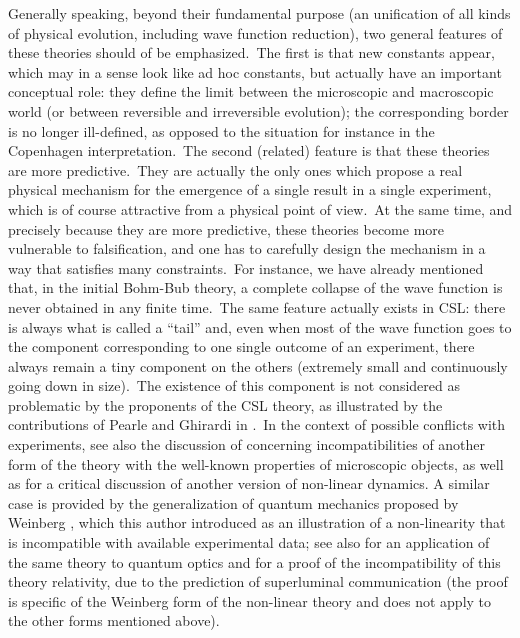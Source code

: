 \documentclass[12pt,onecolumn]{article}%
\begin{document}
Generally speaking, beyond their fundamental purpose (an unification of all
kinds of physical evolution, including wave function reduction), two general
features of these theories should of be emphasized.\ The first is that new
constants appear, which may in a sense look like ad hoc constants, but
actually have an important conceptual role: they define the limit between the
microscopic and macroscopic world (or between reversible and irreversible
evolution); the corresponding border is no longer ill-defined, as opposed to
the situation for instance in the Copenhagen interpretation.\ The second
(related) feature is that these theories are more predictive.\ They are
actually the only ones which propose a real physical mechanism for the
emergence of a single result in a single experiment, which is of course
attractive from a physical point of view.\ At the same time, and precisely
because they are more predictive, these theories become more vulnerable to
falsification, and one has to carefully design the mechanism in a way that
satisfies many constraints.\ For instance, we have already mentioned that, in
the initial Bohm-Bub theory, a complete collapse of the wave function is never
obtained in any finite time.\ The same feature actually exists in CSL: there
is always what is called a ``tail'' and, even when most of the wave function
goes to the component corresponding to one single outcome of an experiment,
there always remain a tiny component on the others (extremely small and
continuously going down in size).\ The existence of this component is not
considered as problematic by the proponents of the CSL theory, as illustrated
by the contributions of Pearle and Ghirardi in \cite{Shimony-Festschrift}.\ In
the context of possible conflicts with experiments, see also the discussion of
\cite{GGR} concerning incompatibilities of another form of the theory with the
well-known properties of microscopic objects, as well as \cite{BGRW-2} for a
critical discussion of another version of non-linear dynamics. A similar case
is provided by the generalization of quantum mechanics proposed by Weinberg
\cite{Weinberg}, which this author introduced as an illustration of a
non-linearity that is incompatible with available experimental data; see also
\cite{WS} for an application of the same theory to quantum optics and
\cite{Gisin-Weinberg} for a proof of the incompatibility of this theory
relativity, due to the prediction of superluminal communication (the proof is
specific of the Weinberg form of the non-linear theory and does not apply to
the other forms mentioned above).
\end{document}
